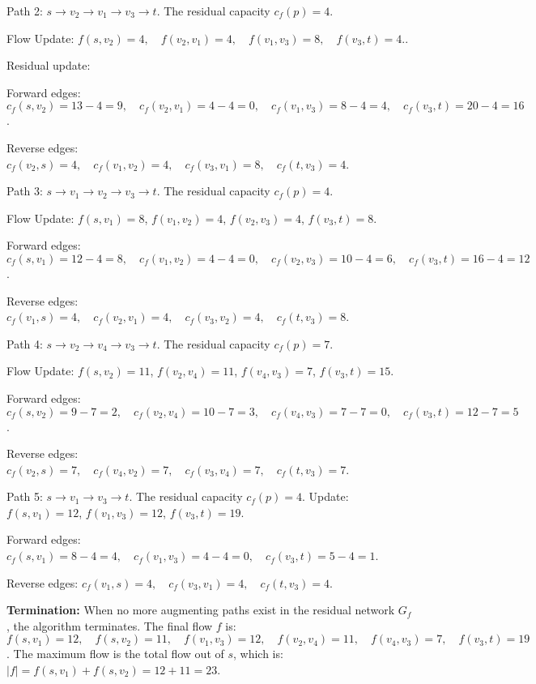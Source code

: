 \par Path 2: $s \to v_2 \to v_1 \to v_3 \to t$. The residual capacity $c_f(p) = 4$. 
\par \quad Flow Update: $f(s, v_2) = 4, \quad f(v_2, v_1) = 4, \quad f(v_1, v_3) = 8, \quad f(v_3, t) = 4.$.
\par \quad Residual update: 
\par \quad Forward edges: $c_f(s, v_2) = 13 - 4 = 9, \quad c_f(v_2, v_1) = 4 - 4 = 0, \quad c_f(v_1, v_3) = 8 - 4 = 4, \quad c_f(v_3, t) = 20 - 4 = 16$.
\par \quad Reverse edges: $c_f(v_2, s) = 4, \quad c_f(v_1, v_2) = 4, \quad c_f(v_3, v_1) = 8, \quad c_f(t, v_3) = 4$.

\par Path 3: $s \to v_1 \to v_2 \to v_3 \to t$. The residual capacity $c_f(p) = 4$. 
\par \quad Flow Update: $f(s, v_1) = 8$, $f(v_1, v_2) = 4$, $f(v_2, v_3) = 4$, $f(v_3, t) = 8$.
\par \quad Forward edges: $c_f(s, v_1) = 12 - 4 = 8, \quad c_f(v_1, v_2) = 4 - 4 = 0, \quad c_f(v_2, v_3) = 10 - 4 = 6, \quad c_f(v_3, t) = 16 - 4 = 12$.
\par \quad Reverse edges: $c_f(v_1, s) = 4, \quad c_f(v_2, v_1) = 4, \quad c_f(v_3, v_2) = 4, \quad c_f(t, v_3) = 8$.

\par Path 4: $s \to v_2 \to v_4 \to v_3 \to t$. The residual capacity $c_f(p) = 7$. 
\par \quad Flow Update: $f(s, v_2) = 11$, $f(v_2, v_4) = 11$, $f(v_4, v_3) = 7$, $f(v_3, t) = 15$.
\par \quad Forward edges: $c_f(s, v_2) = 9 - 7 = 2, \quad c_f(v_2, v_4) = 10 - 7 = 3, \quad c_f(v_4, v_3) = 7 - 7 = 0, \quad c_f(v_3, t) = 12 - 7 = 5$.
\par \quad Reverse edges: $c_f(v_2, s) = 7, \quad c_f(v_4, v_2) = 7, \quad c_f(v_3, v_4) = 7, \quad c_f(t, v_3) = 7$.

\par Path 5: $s \to v_1 \to v_3 \to t$. The residual capacity $c_f(p) = 4$. Update:
$f(s, v_1) = 12$, $f(v_1, v_3) = 12$, $f(v_3, t) = 19$.
\par \quad Forward edges: $c_f(s, v_1) = 8 - 4 = 4, \quad c_f(v_1, v_3) = 4 - 4 = 0, \quad c_f(v_3, t) = 5 - 4 = 1$.
\par \quad Reverse edges: $c_f(v_1, s) = 4, \quad c_f(v_3, v_1) = 4, \quad c_f(t, v_3) = 4$.

\textbf{Termination:} When no more augmenting paths exist in the residual network $G_f$, the algorithm terminates. The final flow $f$ is: $f(s, v_1) = 12, \quad f(s, v_2) = 11, \quad f(v_1, v_3) = 12, \quad f(v_2, v_4) = 11, \quad f(v_4, v_3) = 7, \quad f(v_3, t) = 19$. The maximum flow is the total flow out of $s$, which is: $|f| = f(s, v_1) + f(s, v_2) = 12 + 11 = 23$.


